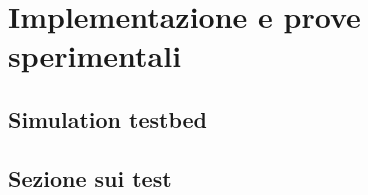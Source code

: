 \chapter{Implementazione e prove sperimentali}

\section{Simulation testbed}

\section{Sezione sui test}